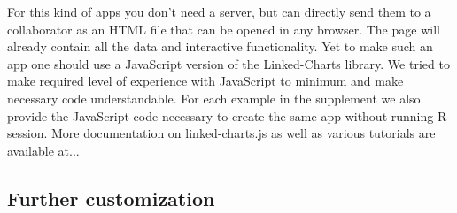 \documentclass[twocolumn,10pt]{article}
\begin{document}
For this kind of apps you don't need a server, but can directly send them to a collaborator as an HTML file that can be opened in any browser. The page will already contain all the data and interactive functionality. Yet to make such an app one should use a JavaScript version of the Linked-Charts library. We tried to make required level of experience with JavaScript to minimum and make necessary code understandable. For each example in the supplement we also provide the JavaScript code necessary to create the same app without running R session. More documentation on linked-charts.js as well as various tutorials are available at...

\subsection{Further customization}



\begin{small} 
\balance

\end{small}
\end{document}
